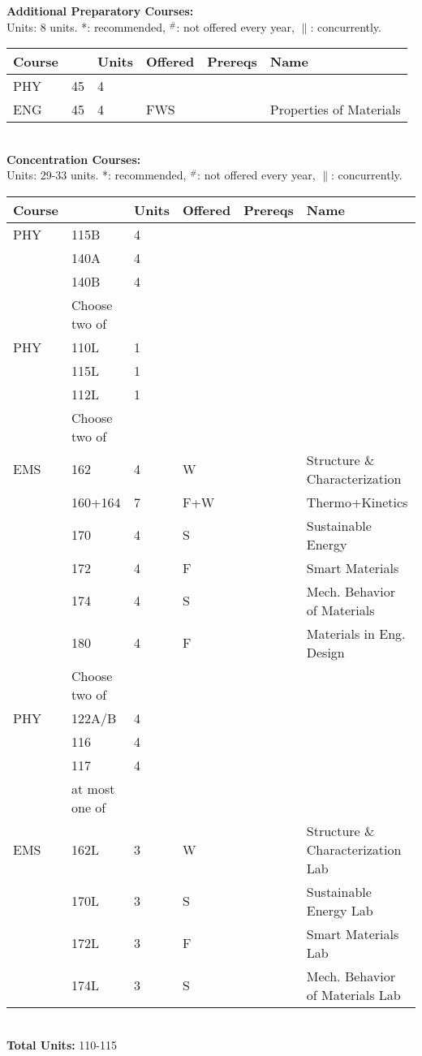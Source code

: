 \documentclass[12pt]{article}
\begin{document}
\newpage
{}
\vskip 0.25cm
\noindent
{\bf Additional Preparatory Courses:  }\\
Units:  8 units. *: recommended, $^\#$: not offered every year, $\parallel$: concurrently.\\
\begin{tabular}{|llllll|}
\hline
Course & & Units & Offered & Prereqs & Name \\
\hline
PHY & 45     & 4 & & & \\
ENG & 45     & 4 & FWS & & Properties of Materials \\
\hline
\end{tabular}\\
\vskip 0.25cm
\noindent
{\bf Concentration Courses:  }\\
Units:  29-33 units. *: recommended, $^\#$: not offered every year, $\parallel$: concurrently.\\
\begin{tabular}{|llllll|}
\hline
Course & & Units & Offered & Prereqs & Name \\
\hline
PHY & 115B   & 4 & & & \\
    & 140A   & 4 & & & \\
    & 140B   & 4 & & & \\
\hline
\hline
    & Choose two of & & & & \\
\hline
PHY & 110L & 1 & & & \\
    & 115L & 1 & & & \\
    & 112L & 1 & & & \\
\hline
\hline
    & Choose two of & & & & \\
\hline
EMS & 162     & 4 & W & & Structure \& Characterization \\
    & 160+164 & 7 & F+W & & Thermo+Kinetics \\
    & 170     & 4 & S & & Sustainable Energy \\ 
    & 172     & 4 & F & & Smart Materials \\
    & 174     & 4 & S & & Mech. Behavior of Materials\\
    & 180     & 4 & F & & Materials in Eng. Design\\
\hline
\hline
    & Choose two of & & & & \\
\hline
PHY & 122A/B & 4 & & & \\
    & 116   & 4 & & & \\
    & 117   & 4 & & & \\
    & at most one of & & & & \\
EMS & 162L   & 3 & W & & Structure \& Characterization Lab\\
    & 170L   & 3 & S & & Sustainable Energy Lab \\
    & 172L   & 3 & F & & Smart Materials Lab \\
    & 174L   & 3 & S & & Mech. Behavior of Materials Lab \\
\hline
\end{tabular}\\
\noindent
{\bf Total Units:} 110-115 \\
\end{document}
